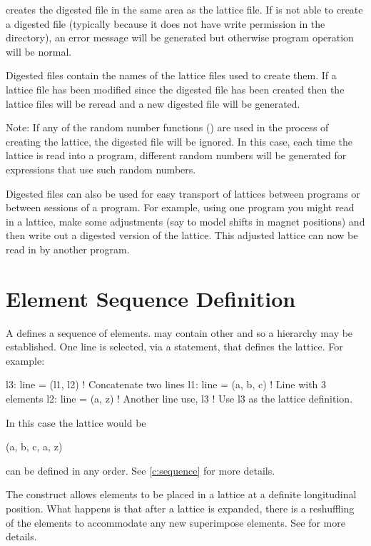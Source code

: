 \bmad creates the digested file in the same area as the lattice file.
If \bmad is not able to create a digested file (typically because it
does not have write permission in the directory), an error message will
be generated but otherwise program operation will be normal.

Digested files contain the names of the lattice files used to create
them. If a lattice file has been modified since the digested file has
been created then the lattice files will be reread and a new
digested file will be generated. 

Note: If any of the random number functions () are
used in the process of creating the lattice, the digested file will be
ignored. In this case, each time the lattice is read into a program,
different random numbers will be generated for expressions that use such
random numbers.

Digested files can also be used for easy transport of lattices between
programs or between sessions of a program. For example, using one
program you might read in a lattice, make some adjustments (say to model
shifts in magnet positions) and then write out a digested version of the
lattice. This adjusted lattice can now be read in by another program.

\section{Element Sequence Definition}

A  defines a sequence of elements.  may contain
other  and so a hierarchy may be established. One line is
selected, via a  statement, that defines the lattice. For
example:
\begin{example}
  l3: line = (l1, l2)   ! Concatenate two lines
  l1: line = (a, b, c)  ! Line with 3 elements
  l2: line = (a, z)     ! Another line 
  use, l3               ! Use l3 as the lattice definition.
\end{example}
In this case the lattice would be
\begin{example}
  (a, b, c, a, z)
\end{example}
 can be defined in any order. See \cref{c:sequence} for more
details.

The  construct allows elements to be placed in a
lattice at a definite longitudinal position. What happens is that
after a lattice is expanded, there is a reshuffling of the elements to
accommodate any new superimpose elements. See  for more
details.

